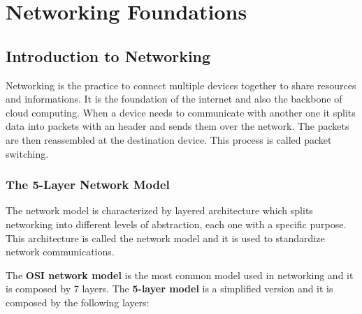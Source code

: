 
\chapter{Networking Foundations}

\section{Introduction to Networking}

Networking is the practice to connect multiple devices together to share resources and informations. It is the foundation of the internet and also the backbone of cloud computing. When a device needs to communicate with another one it splits data into packets with an header and sends them over the network. The packets are then reassembled at the destination device. This process is called packet switching.

\subsection{The 5-Layer Network Model}

The network model is characterized by layered architecture which splits networking into different levels of abstraction, each one with a specific purpose. This architecture is called the network model and it is used to standardize network communications.

The \textbf{OSI network model} is the most common model used in networking and it is composed by 7 layers. The \textbf{5-layer model} is a simplified version and it is composed by the following layers:

